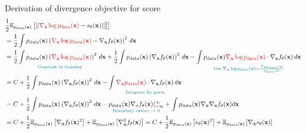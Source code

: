 \documentclass[aspectratio=169,xcolor=dvipsnames]{beamer}
\newcommand{\bx}{\mathbf{x}}
\newcommand{\nbx}{\nabla_{\bx}}
\begin{document}




\begin{frame}{Derivation of divergence objective for score}
  \small
  \begin{align*}
    &\frac{1}{2}\mathbb{E}_{p_\text{data}(\bx)} \left[ || \textcolor{red}{\nbx \log p_\text{data}(\bx)} - s_\theta(\bx) ||_2^2\right]\\
    &= \frac{1}{2} \int p_\text{data}(\bx) \left(\textcolor{red}{\nbx \log p_\text{data}(\bx)} - \nbx f_\theta(\bx) \right)^2 \,d\bx\\
    &= \underset{\textcolor{teal}{{\text{Constant in training}}}}{\frac{1}{2} \int p_\text{data}(\bx) \left(\textcolor{red}{\nbx \log p_\text{data}(\bx)}\right)^2 \,d\bx
    }+ \frac{1}{2} \int p_\text{data}(\bx) \left(\nbx f_\theta(\bx) \right)^2 \,d\bx - \underset{
    \textcolor{teal}{\text{Use }\nbx \log p_\text{data}(\bx) = \frac{\nbx p_\text{data}(\bx)}{p_\text{data}(\bx)}}  
    }
    {\int p_\text{data}(\bx) \textcolor{red}{\nbx \log p_\text{data}(\bx)} \cdot \nbx f_\theta(\bx) \,d\bx}\\
    &= C + \frac{1}{2} \int p_\text{data}(\bx) \left(\nbx f_\theta(\bx) \right)^2 \,d\bx - \underset{\textcolor{teal}{\text{Integrate by parts}}}{\int \textcolor{red}{\nbx p_\text{data}(\bx)}  \cdot \nbx f_\theta (\bx) \,d \bx}\\
    &=  C + \frac{1}{2} \int p_\text{data}(\bx) \left(\nbx f_\theta(\bx) \right)^2 \,d\bx - \underset{\textcolor{teal}{\text{Boundary values } \to~ 0}}{p_\text{data}(\bx) \nabla_x f_\theta(\bx)|_{-\infty}^{\infty}}  + \int p_\text{data}(\bx) \nbx \nbx f_\theta(\bx) d \bx\\
    &= C + \frac{1}{2} \mathbb{E}_{p_\text{data}(\bx)} \left[\nbx f_\theta(\bx)^2\right] +\mathbb{E}_{p_\text{data}(\bx)} \left[ \nbx^2 f_\theta(\bx)\right] = C + \frac{1}{2}\mathbb{E}_{p_\text{data}(\bx)} \left[ s_\theta(\bx)^2\right] + \mathbb{E}_{p_\text{data}(\bx)}\left[\nbx s_\theta(\bx) \right]
  \end{align*}
\end{frame}
\end{document}
